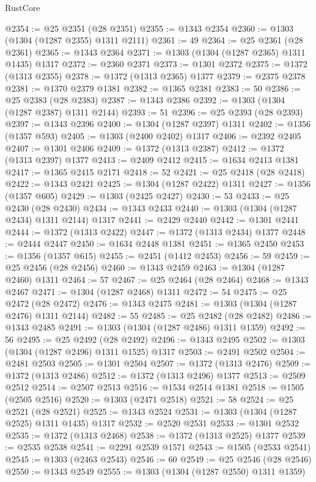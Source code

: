 \begin{lexlean}{RustCore}
\begin{coremodule}
@2354 := @25 @2351 (@28 @2351)
@2355 := @1343 @2354
@2360 := @1303 (@1304 (@1287 @2355) @1311 @2111)
@2361 := 49
@2364 := @25 @2361 (@28 @2361)
@2365 := @1343 @2364
@2371 := @1303 (@1304 (@1287 @2365) @1311 @1435) @1317
@2372 := @2360 @2371
@2373 := @1301 @2372
@2375 := @1372 (@1313 @2355)
@2378 := @1372 (@1313 @2365) @1377
@2379 := @2375 @2378
@2381 := @1370 @2379 @1381
@2382 := @1365 @2381
@2383 := 50
@2386 := @25 @2383 (@28 @2383)
@2387 := @1343 @2386
@2392 := @1303 (@1304 (@1287 @2387) @1311 @2144)
@2393 := 51
@2396 := @25 @2393 (@28 @2393)
@2397 := @1343 @2396
@2400 := @1304 (@1287 @2397) @1311
@2402 := @1356 (@1357 @593)
@2405 := @1303 (@2400 @2402) @1317
@2406 := @2392 @2405
@2407 := @1301 @2406
@2409 := @1372 (@1313 @2387)
@2412 := @1372 (@1313 @2397) @1377
@2413 := @2409 @2412
@2415 := @1634 @2413 @1381
@2417 := @1365 @2415 @2171
@2418 := 52
@2421 := @25 @2418 (@28 @2418)
@2422 := @1343 @2421
@2425 := @1304 (@1287 @2422) @1311
@2427 := @1356 (@1357 @605)
@2429 := @1303 (@2425 @2427)
@2430 := 53
@2433 := @25 @2430 (@28 @2430)
@2434 := @1343 @2433
@2440 := @1303 (@1304 (@1287 @2434) @1311 @2144) @1317
@2441 := @2429 @2440
@2442 := @1301 @2441
@2444 := @1372 (@1313 @2422)
@2447 := @1372 (@1313 @2434) @1377
@2448 := @2444 @2447
@2450 := @1634 @2448 @1381
@2451 := @1365 @2450
@2453 := @1356 (@1357 @615)
@2455 := @2451 (@1412 @2453)
@2456 := 59
@2459 := @25 @2456 (@28 @2456)
@2460 := @1343 @2459
@2463 := @1304 (@1287 @2460) @1311
@2464 := 57
@2467 := @25 @2464 (@28 @2464)
@2468 := @1343 @2467
@2471 := @1304 (@1287 @2468) @1311
@2472 := 54
@2475 := @25 @2472 (@28 @2472)
@2476 := @1343 @2475
@2481 := @1303 (@1304 (@1287 @2476) @1311 @2144)
@2482 := 55
@2485 := @25 @2482 (@28 @2482)
@2486 := @1343 @2485
@2491 := @1303 (@1304 (@1287 @2486) @1311 @1359)
@2492 := 56
@2495 := @25 @2492 (@28 @2492)
@2496 := @1343 @2495
@2502 := @1303 (@1304 (@1287 @2496) @1311 @1525) @1317
@2503 := @2491 @2502
@2504 := @2481 @2503
@2505 := @1301 @2504
@2507 := @1372 (@1313 @2476)
@2509 := @1372 (@1313 @2486)
@2512 := @1372 (@1313 @2496) @1377
@2513 := @2509 @2512
@2514 := @2507 @2513
@2516 := @1534 @2514 @1381
@2518 := @1505 (@2505 @2516)
@2520 := @1303 (@2471 @2518)
@2521 := 58
@2524 := @25 @2521 (@28 @2521)
@2525 := @1343 @2524
@2531 := @1303 (@1304 (@1287 @2525) @1311 @1435) @1317
@2532 := @2520 @2531
@2533 := @1301 @2532
@2535 := @1372 (@1313 @2468)
@2538 := @1372 (@1313 @2525) @1377
@2539 := @2535 @2538
@2541 := @2291 @2539 @1571
@2543 := @1505 (@2533 @2541)
@2545 := @1303 (@2463 @2543)
@2546 := 60
@2549 := @25 @2546 (@28 @2546)
@2550 := @1343 @2549
@2555 := @1303 (@1304 (@1287 @2550) @1311 @1359)

\end{coremodule}
\end{lexlean}
